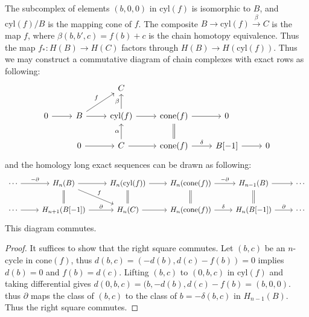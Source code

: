 \begin{lemma} The subcomplex of elements $(b,0,0)$ in $\textrm{cyl}(f)$ is isomorphic to $B$, and $\textrm{cyl}(f)/B$ is the mapping cone of $f$. The composite $B\rightarrow \textrm{cyl}(f)\xrightarrow{\beta} C$ is the map $f$, where $\beta(b,b',c)=f(b)+c$ is the chain homotopy equivalence. Thus the map $f_*:H(B)\rightarrow H(C)$ factors through $H(B)\rightarrow H(\textrm{cyl}(f))$. Thus we may construct a commutative diagram of chain complexes with exact rows as following:
\begin{equation}
\begin{tikzcd}
&&C&&&\\
0\arrow[r]&B\arrow{ru}{f}\arrow[r]&\textrm{cyl}(f)\arrow{u}{\beta}\arrow[r]&\textrm{cone}(f)\arrow[r]\arrow[d,equal]&0&\\
&0\arrow[r]&C\arrow{u}{\alpha}\arrow{r}&\textrm{cone}(f)\arrow{r}{\delta}&B[-1]\arrow{r}&0
\end{tikzcd}
\end{equation}
and the homology long exact sequences can be drawn as following:
\begin{equation}
\begin{tikzcd}
\cdots\arrow{r}{-\partial}&H_n(B)\arrow[r]\arrow[d,equal]\arrow{rd}{f}&H_n(\textrm{cyl}(f))\arrow[d,equal]\arrow[r]&H_n(\textrm{cone}(f))\arrow{r}{-\partial}\arrow[d,equal]&H_{n-1}(B)\arrow[r]\arrow[d,equal]&\cdots\\
\cdots\arrow[r]&H_{n+1}(B[-1])\arrow{r}{\partial}&H_n(C)\arrow[r]&H_n(\textrm{cone}(f))\arrow{r}{\delta}&H_{n}(B[-1])\arrow{r}{\partial}&\cdots
\end{tikzcd}
\end{equation}
This diagram commutes.
\end{lemma}
\begin{proof}
It suffices to show that the right square commutes. Let $(b,c)$ be an $n$-cycle in $\textrm{cone}(f)$, thus $d(b,c)=(-d(b),d(c)-f(b))=0$ implies $d(b)=0$ and $f(b)=d(c)$. Lifting $(b,c)$ to $(0,b,c)$ in $\textrm{cyl}(f)$ and taking differential gives $d(0,b,c)=(b,-d(b),d(c)-f(b)=(b,0,0)$. thus $\partial$ maps the class of $(b,c)$ to the class of $b=-\delta(b,c)$ in $H_{n-1}(B)$. Thus the right square commutes.
\end{proof}

